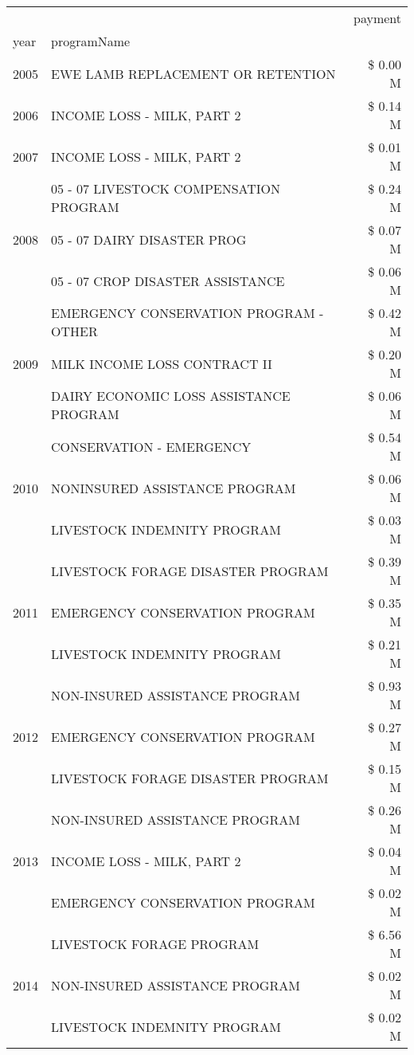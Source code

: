 \begin{tabular}{llr}
\toprule
 &  & payment \\
year & programName &  \\
\midrule
2005 & EWE LAMB REPLACEMENT OR RETENTION & \$ 0.00 M \\
\cline{1-3}
2006 & INCOME LOSS - MILK, PART 2 & \$ 0.14 M \\
\cline{1-3}
2007 & INCOME LOSS - MILK, PART 2 & \$ 0.01 M \\
\cline{1-3}
\multirow[t]{3}{*}{2008} & 05 - 07 LIVESTOCK COMPENSATION PROGRAM & \$ 0.24 M \\
 & 05 - 07 DAIRY DISASTER PROG & \$ 0.07 M \\
 & 05 - 07 CROP DISASTER ASSISTANCE & \$ 0.06 M \\
\cline{1-3}
\multirow[t]{3}{*}{2009} & EMERGENCY CONSERVATION PROGRAM - OTHER & \$ 0.42 M \\
 & MILK INCOME LOSS CONTRACT II & \$ 0.20 M \\
 & DAIRY ECONOMIC LOSS ASSISTANCE PROGRAM & \$ 0.06 M \\
\cline{1-3}
\multirow[t]{3}{*}{2010} & CONSERVATION - EMERGENCY & \$ 0.54 M \\
 & NONINSURED ASSISTANCE PROGRAM & \$ 0.06 M \\
 & LIVESTOCK INDEMNITY PROGRAM & \$ 0.03 M \\
\cline{1-3}
\multirow[t]{3}{*}{2011} & LIVESTOCK FORAGE DISASTER PROGRAM & \$ 0.39 M \\
 & EMERGENCY CONSERVATION PROGRAM & \$ 0.35 M \\
 & LIVESTOCK INDEMNITY PROGRAM & \$ 0.21 M \\
\cline{1-3}
\multirow[t]{3}{*}{2012} & NON-INSURED ASSISTANCE PROGRAM & \$ 0.93 M \\
 & EMERGENCY CONSERVATION PROGRAM & \$ 0.27 M \\
 & LIVESTOCK FORAGE DISASTER PROGRAM & \$ 0.15 M \\
\cline{1-3}
\multirow[t]{3}{*}{2013} & NON-INSURED ASSISTANCE PROGRAM & \$ 0.26 M \\
 & INCOME LOSS - MILK, PART 2 & \$ 0.04 M \\
 & EMERGENCY CONSERVATION PROGRAM & \$ 0.02 M \\
\cline{1-3}
\multirow[t]{3}{*}{2014} & LIVESTOCK FORAGE PROGRAM & \$ 6.56 M \\
 & NON-INSURED ASSISTANCE PROGRAM & \$ 0.02 M \\
 & LIVESTOCK INDEMNITY PROGRAM & \$ 0.02 M \\

\end{tabular}
